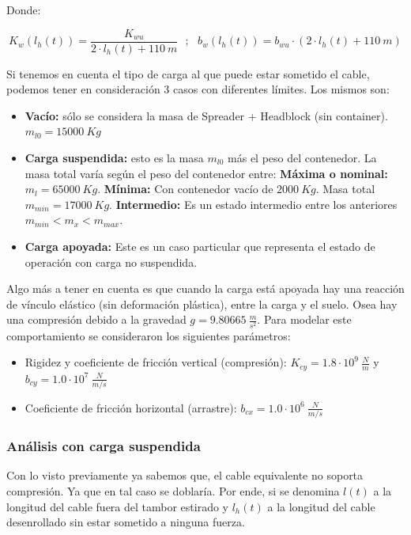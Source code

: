 \documentclass[11pt]{article}
\begin{document}
Donde:

\begin{equation}
	\label{eq:sistema_izaje_fuerza_cable_params}
	K_{w}\left ( l_{h}(t) \right )=\frac{K_{wu}}{2\cdot l_{h}(t)+110\ m}\ \ \ ;\ \ \ b_{w}\left ( l_{h}(t) \right )=b_{wu}\cdot \left ( 2\cdot l_{h}(t)+110\ m \right )
\end{equation}

Si tenemos en cuenta el tipo de carga al que puede estar sometido el cable, podemos tener en consideración 3 casos con diferentes límites. Los mismos son:

\begin{itemize}
	\item \textbf{Vacío:} sólo se considera la masa de Spreader + Headblock (sin container). $m_{l0}=15000\ Kg$
	\item \textbf{Carga suspendida:} esto es la masa $m_{l0}$ más el peso del contenedor. La masa total varía según el peso del contenedor entre:
		\subitem \textbf{Máxima o nominal:} $m_{l}=65000\ Kg$.
		\subitem \textbf{Mínima:} Con contenedor vacío de $2000\ Kg$. Masa total $m_{min}=17000\ Kg$.
		\subitem \textbf{Intermedio:} Es un estado intermedio entre los anteriores $m_{min}<m_{x}<m_{max}$.
	\item \textbf{Carga apoyada:} Este es un caso particular que representa el estado de operación con carga no suspendida.
	
\end{itemize}

Algo más a tener en cuenta es que cuando la carga está apoyada hay una reacción de vínculo elástico (sin deformación plástica), entre la carga y el suelo. Osea hay una compresión debido a la gravedad $g=9.80665\ \frac{m}{s^{2}}$. Para modelar este comportamiento se consideraron los siguientes parámetros:
\begin{itemize}
	\item Rigidez y coeficiente de fricción vertical (compresión): $K_{cy}=1.8\cdot 10^{9}\ \frac{N}{m}$ y $b_{cy}=1.0\cdot 10^{7}\ \frac{N}{m/s}$
	\item Coeficiente de fricción horizontal (arrastre): $b_{cx}=1.0\cdot 10^{6}\ \frac{N}{m/s}$
\end{itemize}

\subsubsection{Análisis con carga suspendida}

Con lo visto previamente ya sabemos que, el cable equivalente no soporta compresión. Ya que en tal caso se doblaría. Por ende, si se denomina $l(t)$ a la longitud del cable fuera del tambor estirado y $l_{h}(t)$ a la longitud del cable desenrollado sin estar sometido a ninguna fuerza.
\end{document}
